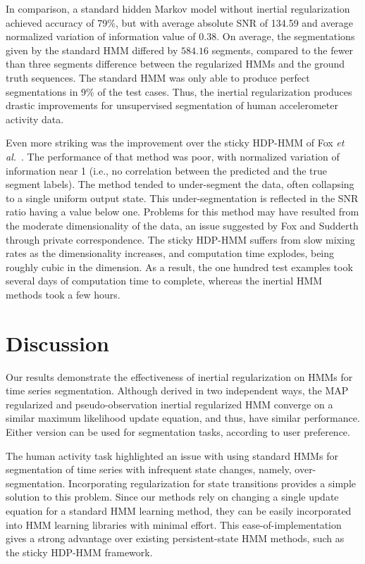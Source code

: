 \documentclass[letterpaper]{article}
\begin{document}
In comparison, a standard hidden Markov model without inertial regularization
achieved accuracy of 79\%, but with average absolute SNR of
134.59 and average normalized variation of information value of $0.38$. On
average, the segmentations given by the standard HMM differed by $584.16$
segments, compared to the fewer than three segments difference between the
regularized HMMs and the ground truth sequences. The standard HMM was only able
to produce perfect segmentations in 9\% of the test cases. Thus, the inertial
regularization produces drastic improvements for unsupervised segmentation of
human accelerometer activity data.

Even more striking was the improvement over the sticky HDP-HMM of Fox \emph{et
al.}~\cite{fox2011sticky}. The performance of that method was poor, with
normalized variation of information near 1 (i.e., no correlation between
the predicted and the true segment labels). The method tended to
under-segment the data, often collapsing to a single uniform output state. This
under-segmentation is reflected in the SNR ratio having
a value below one. Problems for this method may have resulted from the moderate
dimensionality of the data, an issue suggested by Fox and Sudderth through
private correspondence. The sticky HDP-HMM suffers from slow mixing rates as the
dimensionality increases, and computation time explodes, being roughly cubic in
the dimension. As a result, the one hundred test examples took several days of
computation time to complete, whereas the inertial HMM methods took a few hours.

\section{Discussion}

Our results demonstrate the effectiveness of inertial regularization on HMMs for
time series segmentation. Although derived in two independent ways, the MAP
regularized and pseudo-observation inertial regularized HMM converge on a
similar maximum likelihood update equation, and thus, have similar performance.
Either version can be used for segmentation tasks, according to user preference.

The human activity task highlighted an issue with using standard HMMs for
segmentation of time series with infrequent state changes, namely,
over-segmentation. Incorporating regularization for state transitions provides a
simple solution to this problem. Since our methods rely on changing a single
update equation for a standard HMM learning method, they can be easily
incorporated into HMM learning libraries with minimal effort. This
ease-of-implementation gives a strong advantage over existing persistent-state
HMM methods, such as the sticky HDP-HMM framework.
\end{document}

